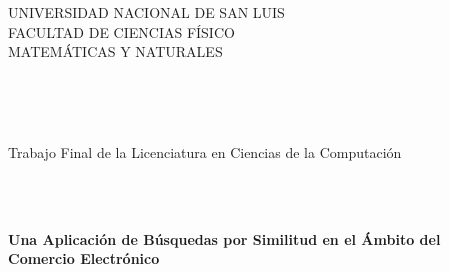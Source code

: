 
\begin{center}

\thispagestyle{empty}



\hspace{-3cm} %







\begin{center}


\end{center}





{\Large UNIVERSIDAD NACIONAL DE SAN LUIS} \\
\vspace{2mm}
{\Large FACULTAD DE CIENCIAS F\'ISICO} \\
\vspace{2mm}
{\Large MATEM\'ATICAS Y NATURALES}

\



\





{\Large {\sc Trabajo Final de la Licenciatura en Ciencias de la Computaci\'on}}\\





\



\





{\Large {\bf {Una Aplicación de B\'usquedas por Similitud en el \'Ambito del Comercio Electr\'onico }}}\\

\vspace{4mm}

\



\



\



\




\end{center}
